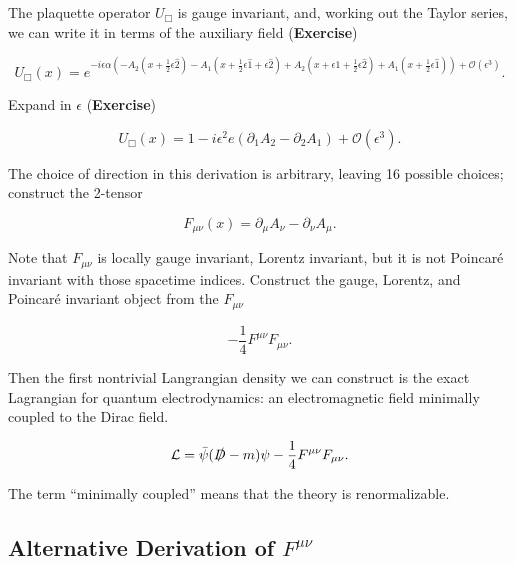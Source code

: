 \noindent The plaquette operator $U_\Box$ is gauge invariant, and, working out the Taylor series, we can write it in terms of the auxiliary field (\textbf{Exercise})

\begin{equation}
U_\Box (x)  = e^{-i \epsilon \alpha (-A_2 (x + \frac{1}{2} \epsilon \hat{2}) - A_1 (x + \frac{1}{2} \epsilon \hat{1} + \epsilon \hat{2}) + A_2 (x + \epsilon \hat{1} +\frac{1}{2} \epsilon \hat{2}) + A_1 (x + \frac{1}{2} \epsilon \hat{1})) + \mathcal{O} (\epsilon^3)}.
\end{equation}

\noindent Expand in $\epsilon$ (\textbf{Exercise})

\begin{equation}
U_\Box (x) = 1 - i \epsilon^2 e (\partial_1 A_2 - \partial_2 A_1 ) + \mathcal{O} (\epsilon^3).
\end{equation}

\noindent The choice of direction in this derivation is arbitrary, leaving 16 possible choices; construct the 2-tensor

\begin{equation}
F_{\mu\nu} (x) = \partial_\mu A_\nu - \partial_\nu A_\mu.
\end{equation}

\noindent Note that $F_{\mu\nu}$ is locally gauge invariant, Lorentz invariant, but it is not Poincar\'e invariant with those spacetime indices. Construct the gauge, Lorentz, and Poincar\'e invariant object from the $F_{\mu\nu}$

\begin{equation}
-\frac{1}{4} F^{\mu\nu} F_{\mu\nu}.
\end{equation}

\noindent Then the first nontrivial Langrangian density we can construct is the exact Lagrangian for quantum electrodynamics: an electromagnetic field minimally coupled to the Dirac field.

\begin{equation}
\mathcal{L} = \bar{\psi} (\slashed{D} - m) \psi -\frac{1}{4} F^{\mu\nu} F_{\mu\nu}.
\end{equation}

\noindent The term ``minimally coupled'' means that the theory is renormalizable. \\

\subsection*{Alternative Derivation of $F^{\mu\nu}$}

